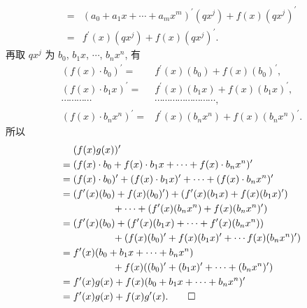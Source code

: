 \begin{pf}
\begin{align*}
        = {} & (a_0 + a_1 x + \cdots + a_m x^m)^{\prime} (qx^j) + f(x) (qx^j)^{\prime}                                \\
        = {} & f^{\prime} (x) (qx^j) + f(x) (qx^j)^{\prime}.
    \end{align*}
    再取 $qx^j$ 为 $b_0$, $b_1 x$, $\cdots$, $b_n x^n$, 有
    \begin{align*}
        (f(x) \cdot b_0)^{\prime}     = {} & f^{\prime} (x) (b_0) + f(x) (b_0)^{\prime},              \\
        (f(x) \cdot b_1 x)^{\prime}   = {} & f^{\prime} (x) (b_1 x) + f(x) (b_1 x)^{\prime},          \\
        \cdots \cdots \cdots \cdots        & \cdots \cdots \cdots \cdots \cdots \cdots \cdots \cdots, \\
        (f(x) \cdot b_n x^n)^{\prime} = {} & f^{\prime} (x) (b_n x^n) + f(x) (b_n x^n)^{\prime}.
    \end{align*}
    所以
    \begin{align*}
             & (f(x) g(x))^{\prime}                                                                           \\
        = {} & (f(x) \cdot b_0 + f(x) \cdot b_1 x + \cdots + f(x) \cdot b_n x^n)^{\prime}                     \\
        = {} & (f(x) \cdot b_0)^{\prime} + (f(x) \cdot b_1 x)^{\prime} + \cdots
        + (f(x) \cdot b_n x^n)^{\prime}                                                                       \\
        = {} & (f^{\prime} (x) (b_0) + f(x) (b_0)^{\prime}) + (f^{\prime} (x) (b_1 x)
        + f(x) (b_1 x)^{\prime})                                                                              \\
             & \qquad \qquad + \cdots + (f^{\prime} (x) (b_n x^n) + f(x) (b_n x^n)^{\prime})                  \\
        = {} & (f^{\prime} (x) (b_0) + (f^{\prime} (x) (b_1 x) + \cdots + f^{\prime} (x) (b_n x^n))           \\
             & \qquad \qquad + (f(x) (b_0)^{\prime} + f(x) (b_1 x)^{\prime} + \cdots f(x) (b_n x^n)^{\prime}) \\
        = {} & f^{\prime} (x) (b_0 + b_1 x + \cdots + b_n x^n)                                                \\
             & \qquad \qquad + f(x) ((b_0)^{\prime} + (b_1 x)^{\prime} + \cdots + (b_n x^n)^{\prime})         \\
        = {} & f^{\prime} (x) g(x) + f(x) (b_0 + b_1 x + \cdots + b_n x^n)^{\prime}                           \\
        = {} & f^{\prime} (x) g(x) + f(x) g^{\prime} (x). \qedhere
    \end{align*}
\end{pf}

